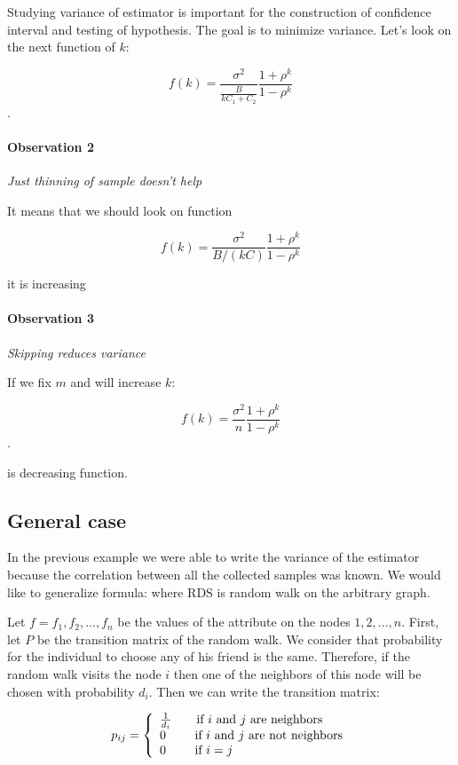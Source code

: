 \documentclass[12pt]{report}
\begin{document}
Studying variance of estimator is important for the construction of confidence interval and testing of hypothesis.
The goal is to minimize variance. Let's look on the next function of $k$:

$$ f(k) = \frac{\sigma^2}{\frac{B}{kC_1 + C_2}} \frac{1+\rho^{k}}{1-\rho^{k}}$$.




\paragraph{Observation 2} \textit{Just thinning of sample doesn't help}

It means that we should look on function 

$$ f(k) = \frac{\sigma^2}{B/(kC)} \frac{1+\rho^{k}}{1-\rho^{k}}$$

it is increasing

\paragraph{Observation 3} \textit{Skipping reduces variance}

If we fix $m$ and will increase $k$:

$$ f(k) = \frac{\sigma^2}{n} \frac{1+\rho^{k}}{1-\rho^{k}}$$.

is decreasing function.


\subsection{General case}

In the previous example we were able to write the variance of the estimator because the correlation between all the collected samples was known. We would like to generalize formula: where RDS is random walk on the arbitrary graph.

Let $f = {f_1 , f_2, ..., f_n}$ be the values of the attribute on the nodes $1, 2, ..., n$.
First, let $P$ be the transition matrix of the random walk. We consider that probability for the individual to choose any of his friend is the same. Therefore, if the random walk visits the node $i$ then one of the neighbors of this node will be chosen with probability $d_i$. Then we can write the transition matrix:


\[
    p_{ij}=\left\{
                \begin{array}{ll}
                  \frac{1}{d_i} \qquad \textnormal{if $i$ and $j$ are neighbors} \\
                  0 \qquad \textnormal{ if $i$ and $j$ are not neighbors}\\
                  0 \qquad \textnormal{ if $i = j$}
                \end{array}
              \right.
  \]
  
\end{document}
